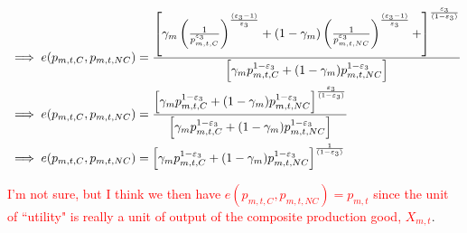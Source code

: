 \begin{equation}
\begin{split}
&\implies e(p_{m,t,C},p_{m,t,NC}) = 
\frac{\left[\gamma_{m}\left( \frac{1}{p_{m,t,C}^{\varepsilon_{3}}}\right)^{\frac{(\varepsilon_{3}-1)}{\varepsilon_{3}}}+(1-\gamma_{m})\left(\frac{1}{p_{m,t,NC}^{\varepsilon_{3}}}\right)^{\frac{(\varepsilon_{3}-1)}{\varepsilon_{3}}}+\right]^{\frac{\varepsilon_{3}}{(1-\varepsilon_{3})}}}{\left[\gamma_{m}p_{m,t,C}^{1-\varepsilon_{3}}+(1-\gamma_{m})p_{m,t,NC}^{1-\varepsilon_{3}}\right]}\\
&\implies e(p_{m,t,C},p_{m,t,NC}) = 
\frac{\left[\gamma_{m}p_{m,t,C}^{1-\varepsilon_{3}}+(1-\gamma_{m})p_{m,t,NC}^{1-\varepsilon_{3}}\right]^{\frac{\varepsilon_{3}}{(1-\varepsilon_{3})}}}{\left[\gamma_{m}p_{m,t,C}^{1-\varepsilon_{3}}+(1-\gamma_{m})p_{m,t,NC}^{1-\varepsilon_{3}}\right]}\\
&\implies e(p_{m,t,C},p_{m,t,NC}) = 
\left[\gamma_{m}p_{m,t,C}^{1-\varepsilon_{3}}+(1-\gamma_{m})p_{m,t,NC}^{1-\varepsilon_{3}}\right]^{\frac{1}{(1-\varepsilon_{3})}}\\
\end{split}
\end{equation}   

\textcolor{red}{I'm not sure, but I think we then have  $e(p_{m,t,C},p_{m,t,NC})=p_{m,t}$ since the unit of ``utility" is really a unit of output of the composite production good, $X_{m,t}$}.


    
    